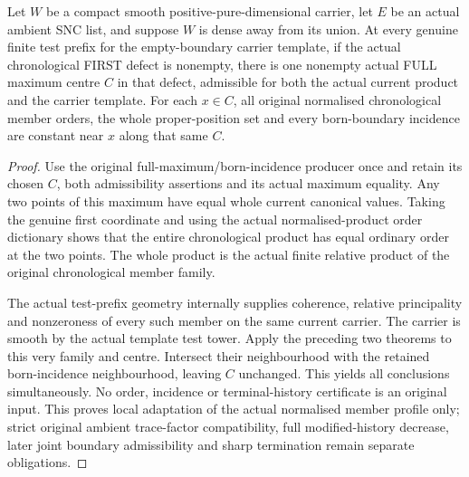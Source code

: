 \begin{theorem}
\label{hir:sharp-actual-full-maximum-original-member-orders}
Let $W$ be a compact smooth positive-pure-dimensional carrier, let $E$
be an actual ambient SNC list, and suppose $W$ is dense away from its
union. At every genuine finite test prefix for the empty-boundary
carrier template, if the actual chronological FIRST defect is nonempty,
there is one nonempty actual FULL maximum centre $C$ in that defect,
admissible for both the actual current product and the carrier template.
For each $x\in C$, all original normalised chronological member orders,
the whole proper-position set and every born-boundary incidence are
constant near $x$ along that same $C$.
\leanok
\end{theorem}
\begin{proof}
Use the original full-maximum/born-incidence producer once and retain its
chosen $C$, both admissibility assertions and its actual maximum equality.
Any two points of this maximum have equal whole current canonical values.
Taking the genuine first coordinate and using the actual normalised-product
order dictionary shows that the entire chronological product has equal
ordinary order at the two points. The whole product is the actual finite
relative product of the original chronological member family.

The actual test-prefix geometry internally supplies coherence, relative
principality and nonzeroness of every such member on the same current
carrier. The carrier is smooth by the actual template test tower. Apply
the preceding two theorems to this very family and centre. Intersect their
neighbourhood with the retained born-incidence neighbourhood, leaving
$C$ unchanged. This yields all conclusions simultaneously. No order,
incidence or terminal-history certificate is an original input. This
proves local adaptation of the actual normalised member profile only;
strict original ambient trace-factor compatibility, full modified-history
decrease, later joint boundary admissibility and sharp termination remain
separate obligations.
\end{proof}
